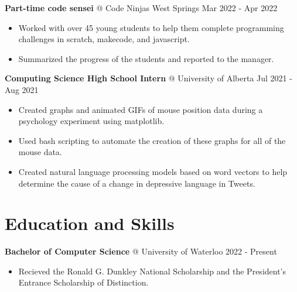 \documentclass{article}
\makeatletter
\newcommand{\smallbullet}{\,\begin{picture}(-1,1)(-1,-3)\circle*{3}\end{picture}\ }
\newenvironment{resumeItem}
{
    \vspace{0.5em}
}
{
}
\newcommand{\experienceHead}[4]{
    \textbf{#1} @ #2 \hfill #3 \\[-1.2em]
}
\newenvironment{resumeList}
{
    \begin{itemize}[label=\smallbullet]
}
{
    \end{itemize}
}
\makeatother
\begin{document}

\begin{resumeItem}
\experienceHead{Part-time code sensei}{Code Ninjas West Springs}{Mar 2022 - Apr 2022}{Calgary, AB.}
\begin{resumeList}
    \item Worked with over 45 young students to help them complete programming challenges in scratch, makecode, and javascript.
    \item Summarized the progress of the students and reported to the manager.
\end{resumeList}
\end{resumeItem}

\begin{resumeItem}
\experienceHead{Computing Science High School Intern}{University of Alberta}{Jul 2021 - Aug 2021}{Online}
\begin{resumeList}
    \item Created graphs and animated GIFs of mouse position data during a psychology experiment using matplotlib.
    \item Used bash scripting to automate the creation of these graphs for all of the mouse data.
    \item Created natural language processing models based on word vectors to help determine the cause of a change in depressive language in Tweets.
\end{resumeList}
\end{resumeItem}


\section{Education and Skills}

\begin{resumeItem}
\experienceHead{Bachelor of Computer Science}{University of Waterloo}{2022 - Present}{Waterloo, ON.}
\begin{resumeList}
    \item Recieved the Ronald G. Dunkley National Scholarship and the President's Entrance Scholarship of Distinction.
\end{resumeList}
\end{resumeItem}
\end{document}

